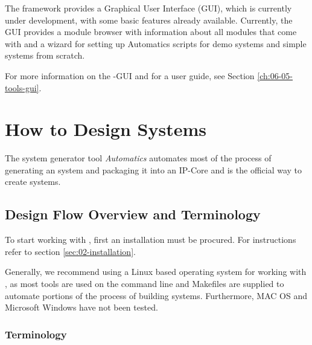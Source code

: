 
The \asterics framework provides a Graphical User Interface (GUI), which is currently under development, with some basic features already available.
Currently, the GUI provides a module browser with information about all modules that come with \asterics and a wizard for setting up Automatics scripts for demo systems and simple systems from scratch.

For more information on the \asterics-GUI and for a user guide, see Section \ref{ch:06-05-tools-gui}.


\section{How to Design \asterics Systems}

The \asterics system generator tool \textit{Automatics} automates most of the process of generating an \asterics system and packaging it into an IP-Core and is the official way to create \asterics systems.

\subsection{Design Flow Overview and Terminology}

To start working with \asterics, first an \asterics installation must be procured.
For instructions refer to section \ref{sec:02-installation}.


Generally, we recommend using a Linux based operating system for working with \asterics, as most tools are used on the command line and Makefiles are supplied to automate portions of the process of building \asterics systems.
Furthermore, MAC OS and Microsoft Windows have not been tested.

\subsubsection*{Terminology}

